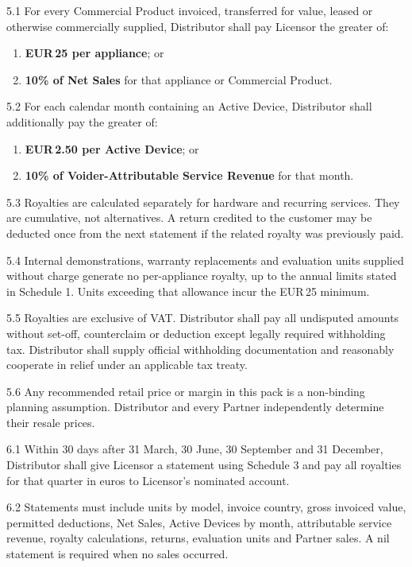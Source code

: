 \documentclass[11pt,a4paper]{article}
\newcommand{\money}{EUR\,}
\newcommand{\strong}[1]{\textbf{\color{voiderblue}#1}}
\newcommand{\articleheading}[2]{%
  \par\medskip{\large\bfseries\color{voiderblue}#1\quad #2}\par\smallskip
}
\begin{document}
\articleheading{5.}{Royalties}

5.1 For every Commercial Product invoiced, transferred for value, leased or otherwise commercially supplied, Distributor shall pay Licensor the greater of:
\begin{enumerate}[label=(\alph*)]
  \item \strong{\money25 per appliance}; or
  \item \strong{10\% of Net Sales} for that appliance or Commercial Product.
\end{enumerate}

5.2 For each calendar month containing an Active Device, Distributor shall additionally pay the greater of:
\begin{enumerate}[label=(\alph*)]
  \item \strong{\money2.50 per Active Device}; or
  \item \strong{10\% of Voider-Attributable Service Revenue} for that month.
\end{enumerate}

5.3 Royalties are calculated separately for hardware and recurring services. They are cumulative, not alternatives. A return credited to the customer may be deducted once from the next statement if the related royalty was previously paid.

5.4 Internal demonstrations, warranty replacements and evaluation units supplied without charge generate no per-appliance royalty, up to the annual limits stated in Schedule 1. Units exceeding that allowance incur the \money25 minimum.

5.5 Royalties are exclusive of VAT. Distributor shall pay all undisputed amounts without set-off, counterclaim or deduction except legally required withholding tax. Distributor shall supply official withholding documentation and reasonably cooperate in relief under an applicable tax treaty.

5.6 Any recommended retail price or margin in this pack is a non-binding planning assumption. Distributor and every Partner independently determine their resale prices.

\articleheading{6.}{Statements, payment and audit}

6.1 Within 30 days after 31 March, 30 June, 30 September and 31 December, Distributor shall give Licensor a statement using Schedule 3 and pay all royalties for that quarter in euros to Licensor's nominated account.

6.2 Statements must include units by model, invoice country, gross invoiced value, permitted deductions, Net Sales, Active Devices by month, attributable service revenue, royalty calculations, returns, evaluation units and Partner sales. A nil statement is required when no sales occurred.
\end{document}
